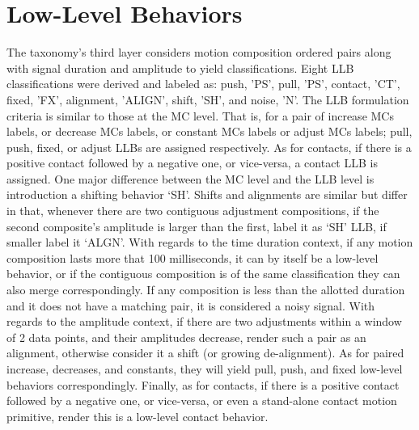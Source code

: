 \section{Low-Level Behaviors} \label{subsec:llbeh}
The taxonomy's third layer considers motion composition ordered pairs along with signal duration and amplitude to yield classifications. Eight LLB classifications were derived and labeled as: {push, 'PS'}, {pull, 'PS'}, {contact, 'CT'}, {fixed, 'FX'}, {alignment, 'ALIGN'}, {shift, 'SH'}, and {noise, 'N'}. The LLB formulation criteria is similar to those at the MC level. That is, for a pair of increase MCs labels, or decrease MCs labels, or constant MCs labels or adjust MCs labels; pull, push, fixed, or adjust LLBs are assigned respectively. As for contacts, if there is a positive contact followed by a negative one, or vice-versa, a contact LLB is assigned. One major difference between the MC level and the LLB level is introduction a shifting behavior `SH'. Shifts and alignments are similar but differ in that, whenever there are two contiguous adjustment compositions, if the second composite's amplitude is larger than the first, label it as `SH' LLB, if smaller label it `ALGN'.
With regards to the time duration context, if any motion composition lasts more that 100 milliseconds, it can by itself be a low-level behavior, or if the contiguous composition is of the same classification they can also merge correspondingly. If any composition is less than the allotted duration and it does not have a matching pair, it is considered a noisy signal. With regards to the amplitude context, if there are two adjustments within a window of 2 data points, and their amplitudes decrease, render such a pair as an alignment, otherwise consider it a shift (or growing de-alignment). As for paired increase, decreases, and constants, they will yield pull, push, and fixed low-level behaviors correspondingly. Finally, as for contacts, if there is a positive contact followed by a negative one, or vice-versa, or even a stand-alone contact motion primitive, render this is a low-level contact behavior.
